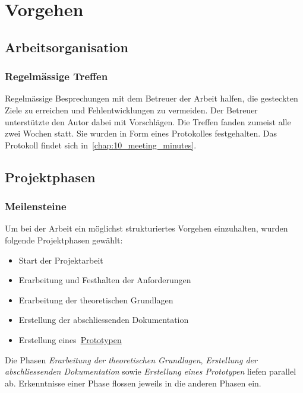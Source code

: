 
\chapter{Vorgehen}
\label{chap:procedure}

\section{Arbeitsorganisation}
\label{sec:organization}

\subsection{Regelmässige Treffen}
\label{subsec:meetings}

Regelmässige Besprechungen mit dem Betreuer der Arbeit halfen, die
gesteckten Ziele zu erreichen und Fehlentwicklungen zu vermeiden. Der
Betreuer unterstützte den Autor dabei mit Vorschlägen. Die Treffen
fanden zumeist alle zwei Wochen statt. Sie wurden in Form eines
Protokolles festgehalten. Das Protokoll findet sich in~\autoref{chap:10_meeting_minutes}.

\section{Projektphasen}
\label{sec:project_schedule}

\subsection{Meilensteine}
\label{subsec:milestones}

Um bei der Arbeit ein möglichst strukturiertes Vorgehen einzuhalten,
wurden folgende Projektphasen gewählt:
\begin{itemize}
    \item Start der Projektarbeit
    \item Erarbeitung und Festhalten der Anforderungen
    \item Erarbeitung der theoretischen Grundlagen
    \item Erstellung der abschliessenden Dokumentation
    \item Erstellung eines~\hyperref[chap:prototype]{Prototypen}
\end{itemize}

Die Phasen \textit{Erarbeitung der theoretischen Grundlagen}, \textit{Erstellung
der abschliessenden Dokumentation} sowie \textit{Erstellung eines
Prototypen} liefen parallel ab. Erkenntnisse einer Phase flossen jeweils in die
anderen Phasen ein.


